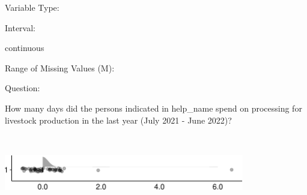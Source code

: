 \documentclass[
]{article}
\begin{document}
\begin{minipage}[t]{0.3\linewidth}

Variable Type:

\end{minipage}%
\begin{minipage}[t]{0.7\linewidth}

\end{minipage}

\begin{minipage}[t]{0.3\linewidth}

Interval:

\end{minipage}%
\begin{minipage}[t]{0.7\linewidth}

continuous

\end{minipage}

\begin{minipage}[t]{0.3\linewidth}

Range of Missing Values (M):

\end{minipage}%
\begin{minipage}[t]{0.7\linewidth}

\end{minipage}

\begin{minipage}[t]{0.3\linewidth}

Question:

\end{minipage}%
\begin{minipage}[t]{0.7\linewidth}

How many days did the persons indicated in help\_name spend on
processing for livestock production in the last year (July 2021 - June
2022)?

\end{minipage}

\begin{minipage}[t]{0.3\linewidth}

~

\end{minipage}%
\begin{minipage}[t]{0.7\linewidth}

\includegraphics[width=396px]{codebook_template_files/figure-latex/q7_39_rainplot-1}

\end{minipage}
 \vspace*{-6mm} 
\end{document}
